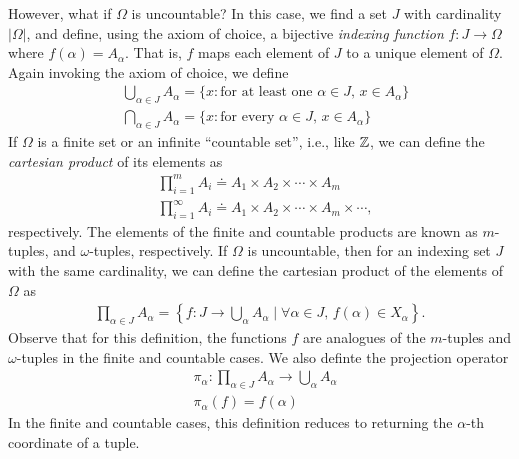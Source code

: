 However, what if $\Omega$ is uncountable? In this case, we find a set $J$ with
cardinality $|\Omega|$, and define, using the axiom of choice, a bijective \emph{indexing function} $f: J
\to \Omega$ where $f(\alpha) = A_{\alpha}$. That is, $f$ maps each element of
$J$ to a unique element of $\Omega$. Again invoking the axiom of choice,
we define
\begin{equation*}
\begin{split}
	& \bigcup_{\alpha \in J} A_{\alpha} = \{ x: \text{for at least one $\alpha \in
J$, $x \in A_{\alpha}$}\} \\
& \bigcap_{\alpha \in J} A_{\alpha} = \{ x: \text{for every $\alpha \in
J$, $x \in A_{\alpha}$}\}
\end{split}
\end{equation*}
If $\Omega$ is a finite set or an infinite ``countable set'', i.e., like $\mathbb{Z}$, 
we can define the \emph{cartesian product} of its elements as
\begin{equation*}
\begin{split}
	& \prod_{i=1}^{m} A_{i} \doteq A_{1} \times A_{2} \times \cdots \times A_{m} \\
	& \prod_{i =1}^{\infty} A_{i} \doteq A_{1} \times A_{2} \times \cdots \times
	A_{m} \times \cdots,
\end{split}
\end{equation*}
respectively. The elements of the finite and countable products are known as
$m$-tuples, and $\omega$-tuples, respectively.
If $\Omega$ is uncountable, then for an indexing set $J$ with the same
cardinality, we can define the cartesian product of the elements of $\Omega$
as 
\begin{equation*}
\begin{split}
	\prod_{\alpha \in J} A_{\alpha} = \left\{ f: J \to \bigcup_{\alpha} A_{\alpha} \mid
	\forall \alpha \in J, \, f(\alpha) \in X_{\alpha}\right\}.
\end{split}
\end{equation*}
Observe that for this definition, the functions $f$ are analogues of the
$m$-tuples and $\omega$-tuples in the finite and countable cases.
We also definte the projection operator
\begin{equation*}
\begin{split}
	& \pi_{\alpha}: \prod_{\alpha \in J} A_{\alpha} \to \bigcup_{\alpha}
	A_{\alpha} \\
	& \pi_{\alpha}(f) = f(\alpha)
\end{split}
\end{equation*}
In the finite and countable cases, this definition reduces to returning
the $\alpha$-th coordinate of a tuple.
